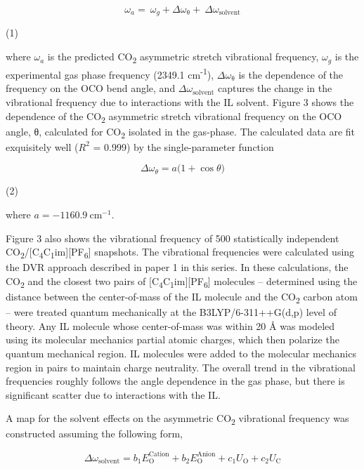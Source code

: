 \documentclass[]{article}
\begin{document}
\[\omega_{a} = \ \omega_{g} + \Delta\omega_{\mathrm{\theta}} + \ \Delta\omega_{\mathrm{\text{solvent}}}\]

(1)

where \(\omega_{a}\) is the predicted CO\textsubscript{2} asymmetric
stretch vibrational frequency, \(\omega_{g}\) is the experimental gas
phase frequency (2349.1 cm\textsuperscript{-1}),
\(\Delta\omega_{\mathrm{\theta}}\) is the dependence of the frequency on
the OCO bend angle, and \(\Delta\omega_{\mathrm{\text{solvent}}}\)
captures the change in the vibrational frequency due to interactions
with the IL solvent. Figure 3 shows the dependence of the
CO\textsubscript{2} asymmetric stretch vibrational frequency on the OCO
angle, θ, calculated for CO\textsubscript{2} isolated in the gas-phase.
The calculated data are fit exquisitely well (\(R^{2}\) = 0.999) by the
single-parameter function

\[\Delta\omega_{\theta} = a(1 + \cos{\theta)}\]

(2)

where \(a = - 1160.9\ \mathrm{c}\mathrm{m}^{\mathrm{- 1}}.\)

Figure 3 also shows the vibrational frequency of 500 statistically
independent
CO\textsubscript{2}/{[}C\textsubscript{4}C\textsubscript{1}im{]}{[}PF\textsubscript{6}{]}
snapshots. The vibrational frequencies were calculated using the DVR
approach described in paper 1 in this series. In these calculations, the
CO\textsubscript{2} and the closest two pairs of
{[}C­\textsubscript{4}C\textsubscript{1}im{]}{[}PF\textsubscript{6}{]}
molecules -- determined using the distance between the center-of-mass of
the IL molecule and the CO\textsubscript{2} carbon atom -- were treated
quantum mechanically at the B3LYP/6-311++G(d,p) level of theory. Any IL
molecule whose center-of-mass was within 20 Å was modeled using its
molecular mechanics partial atomic charges, which then polarize the
quantum mechanical region. IL molecules were added to the molecular
mechanics region in pairs to maintain charge neutrality. The overall
trend in the vibrational frequencies roughly follows the angle
dependence in the gas phase, but there is significant scatter due to
interactions with the IL.

A map for the solvent effects on the asymmetric CO\textsubscript{2}
vibrational frequency was constructed assuming the following form,

\[\Delta\omega_{\mathrm{\text{solvent}}} = b_{1}E_{\mathrm{O}}^{\text{Cation}} + b_{2}E_{\mathrm{O}}^{\text{Anion}} + c_{1}U_{\mathrm{O}} + c_{2}U_{\mathrm{C}}\]
\end{document}

